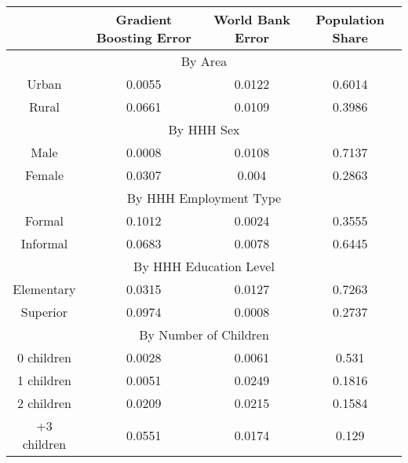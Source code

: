 \begin{table}[]
\begin{tabular}{@{}cccc@{}}
\toprule
            & Gradient Boosting Error & World Bank Error & Population Share \\ \midrule
\multicolumn{4}{c}{By Area}                                                 \\ \midrule
Urban       & 0.0055                  & 0.0122           & 0.6014           \\
Rural       & 0.0661                  & 0.0109           & 0.3986           \\ \midrule
\multicolumn{4}{c}{By HHH Sex}                                              \\ \midrule
Male        & 0.0008                  & 0.0108           & 0.7137           \\
Female      & 0.0307                  & 0.004            & 0.2863           \\ \midrule
\multicolumn{4}{c}{By HHH Employment Type}                                  \\ \midrule
Formal      & 0.1012                  & 0.0024           & 0.3555           \\
Informal    & 0.0683                  & 0.0078           & 0.6445           \\ \midrule
\multicolumn{4}{c}{By HHH Education Level}                                  \\ \midrule
Elementary  & 0.0315                  & 0.0127           & 0.7263           \\
Superior    & 0.0974                  & 0.0008           & 0.2737           \\ \midrule
\multicolumn{4}{c}{By Number of Children}                                   \\ \midrule
0 children  & 0.0028                  & 0.0061           & 0.531            \\
1 children  & 0.0051                  & 0.0249           & 0.1816           \\
2 children  & 0.0209                  & 0.0215           & 0.1584           \\
+3 children & 0.0551                  & 0.0174           & 0.129           
\end{tabular}
\end{table}